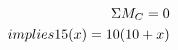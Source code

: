 \documentclass[preview]{standalone}
\begin{document}
\begin{align*}
\special{dvisvgm:raw <g id='unique000'>}\Sigma M_C = 0 \\implies 15(x) = 10(10 + x)\special{dvisvgm:raw </g>}
\end{align*}
\end{document}
